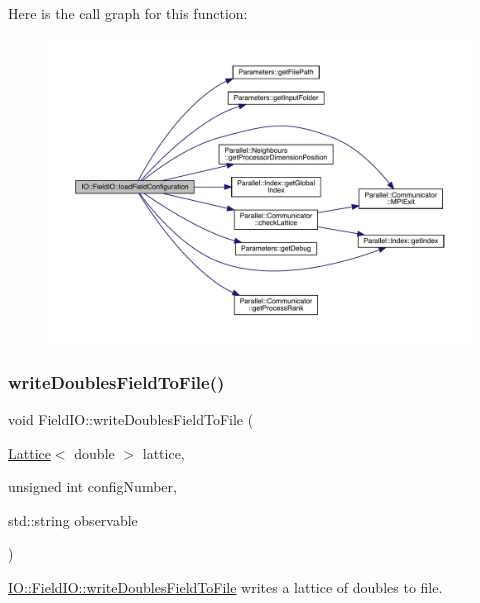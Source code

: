 Here is the call graph for this function\+:\nopagebreak
\begin{figure}[H]
\begin{center}
\leavevmode
\includegraphics[width=350pt]{class_i_o_1_1_field_i_o_a02db864a48601edd7febaab5d655e495_cgraph}
\end{center}
\end{figure}
\mbox{\label{class_i_o_1_1_field_i_o_aaf2bac2025d67c06e7c61e8cc9f44777}} 
\subsubsection{\texorpdfstring{writeDoublesFieldToFile()}{writeDoublesFieldToFile()}}
{\footnotesize\ttfamily void Field\+I\+O\+::write\+Doubles\+Field\+To\+File (\begin{DoxyParamCaption}\item[{\mbox{\hyperlink{class_lattice}{Lattice}}$<$ double $>$}]{lattice,  }\item[{unsigned int}]{config\+Number,  }\item[{std\+::string}]{observable }\end{DoxyParamCaption})\hspace{0.3cm}{\ttfamily [static]}}



\mbox{\hyperlink{class_i_o_1_1_field_i_o_aaf2bac2025d67c06e7c61e8cc9f44777}{I\+O\+::\+Field\+I\+O\+::write\+Doubles\+Field\+To\+File}} writes a lattice of doubles to file. 


